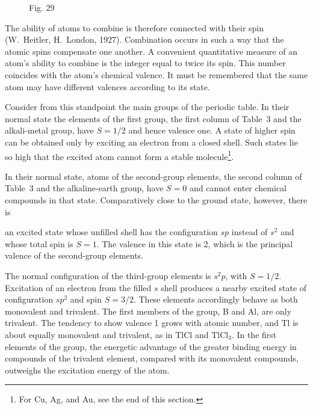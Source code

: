 \begin{figure}[ht]
\centering
{}
\caption*{Fig. 29}
\end{figure}

The ability of atoms to combine is therefore connected with their spin (W.~Heitler, H.~London, 1927). Combination occurs in such a way that the atomic spins compensate one another. A convenient quantitative measure of an atom's ability to combine is the integer equal to twice its spin. This number coincides with the atom's chemical valence. It must be remembered that the same atom may have different valences according to its state.

Consider from this standpoint the main groups of the periodic table. In their normal state the elements of the first group, the first column of Table~3 and the alkali-metal group, have $S=1/2$ and hence valence one. A state of higher spin can be obtained only by exciting an electron from a closed shell. Such states lie so high that the excited atom cannot form a stable molecule\footnote{For Cu, Ag, and Au, see the end of this section.}.

In their normal state, atoms of the second-group elements, the second column of Table~3 and the alkaline-earth group, have $S=0$ and cannot enter chemical compounds in that state. Comparatively close to the ground state, however, there is

an excited state whose unfilled shell has the configuration $sp$ instead of $s^2$ and whose total spin is $S=1$. The valence in this state is 2, which is the principal valence of the second-group elements.

The normal configuration of the third-group elements is $s^2p$, with $S=1/2$. Excitation of an electron from the filled $s$ shell produces a nearby excited state of configuration $sp^2$ and spin $S=3/2$. These elements accordingly behave as both monovalent and trivalent. The first members of the group, B and Al, are only trivalent. The tendency to show valence 1 grows with atomic number, and Tl is about equally monovalent and trivalent, as in TlCl and $\mathrm{TlCl}_3$. In the first elements of the group, the energetic advantage of the greater binding energy in compounds of the trivalent element, compared with its monovalent compounds, outweighs the excitation energy of the atom.


